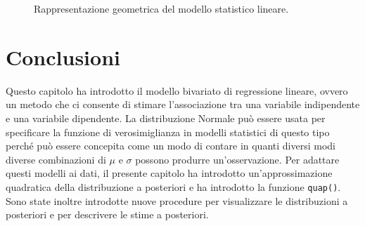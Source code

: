 \begin{figure} %
\centering

\caption{Rappresentazione geometrica del modello statistico lineare.}
\label{fig:mod_reg_bivariata}
\end{figure}


\section*{Conclusioni}

Questo capitolo ha introdotto il modello bivariato di regressione lineare, ovvero un metodo che ci consente di stimare l'associazione tra una variabile indipendente e una variabile dipendente. 
La distribuzione Normale può essere usata per specificare la funzione di verosimiglianza in modelli statistici di questo tipo perché può essere concepita come un modo di contare in quanti diversi modi diverse combinazioni di $\mu$ e $\sigma$ possono produrre un'osservazione. 
Per adattare questi modelli ai dati, il presente capitolo ha introdotto un'approssimazione quadratica della distribuzione a posteriori e ha introdotto la funzione \verb+quap()+. 
Sono state inoltre introdotte nuove procedure per visualizzare le distribuzioni a posteriori e per descrivere le stime a posteriori.

